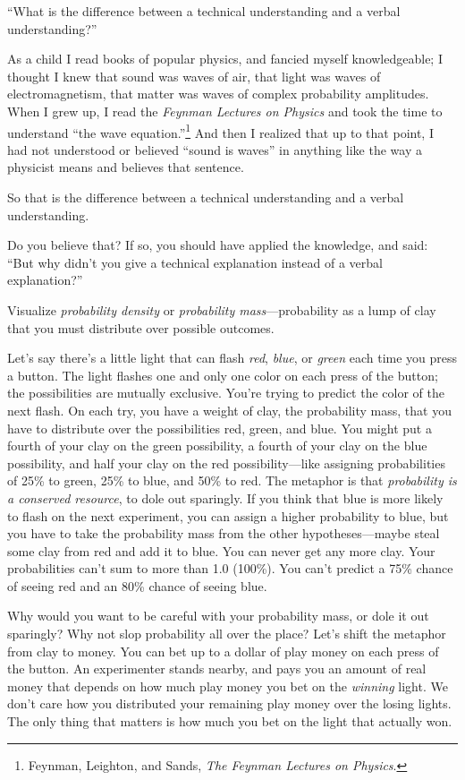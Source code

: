 {
 ``What is the difference between a technical
understanding and a verbal understanding?''}

{
 As a child I read books of popular physics, and fancied myself
knowledgeable; I thought I knew that sound was waves of air, that light
was waves of electromagnetism, that matter was waves of complex
probability amplitudes. When I grew up, I read the \textit{Feynman
Lectures on Physics} and took the time to understand
``the wave
equation.''\footnote{Feynman, Leighton, and Sands, \textit{The Feynman Lectures on
Physics}.} And then I realized
that up to that point, I had not understood or believed
``sound is waves'' in anything like
the way a physicist means and believes that sentence.}

{
 So that is the difference between a technical understanding and a
verbal understanding.}

{
 Do you believe that? If so, you should have applied the knowledge,
and said: ``But why didn't you give a
technical explanation instead of a verbal
explanation?''}

{
 Visualize \textit{probability density} or \textit{probability
mass}{}---probability as a lump of clay that you must distribute over
possible outcomes.}

{
 Let's say there's a little light
that can flash \textit{red}, \textit{blue}, or \textit{green} each time
you press a button. The light flashes one and only one color on each
press of the button; the possibilities are mutually exclusive.
You're trying to predict the color of the next flash.
On each try, you have a weight of clay, the probability mass, that you
have to distribute over the possibilities red, green, and blue. You
might put a fourth of your clay on the green possibility, a fourth of
your clay on the blue possibility, and half your clay on the red
possibility---like assigning probabilities of 25\% to green, 25\% to
blue, and 50\% to red. The metaphor is that \textit{probability is a
conserved resource}, to dole out sparingly. If you think that blue is
more likely to flash on the next experiment, you can assign a higher
probability to blue, but you have to take the probability mass from the
other hypotheses---maybe steal some clay from red and add it to blue.
You can never get any more clay. Your probabilities
can't sum to more than 1.0 (100\%). You
can't predict a 75\% chance of seeing red and an 80\%
chance of seeing blue.}

{
 Why would you want to be careful with your probability mass, or
dole it out sparingly? Why not slop probability all over the place?
Let's shift the metaphor from clay to money. You can
bet up to a dollar of play money on each press of the button. An
experimenter stands nearby, and pays you an amount of real money that
depends on how much play money you bet on the \textit{winning} light.
We don't care how you distributed your remaining play
money over the losing lights. The only thing that matters is how much
you bet on the light that actually won.}

